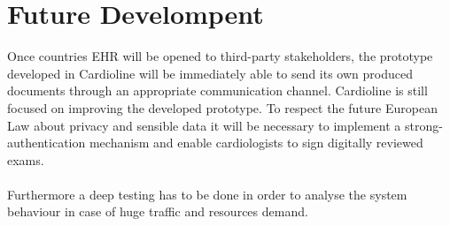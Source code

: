 \section{Future Develompent}
Once countries EHR will be opened to third-party stakeholders, the prototype developed in Cardioline will be immediately able to send its own produced documents through an appropriate communication channel.
Cardioline is still focused on improving the developed prototype. To respect the future European Law about privacy and sensible data it will be necessary to implement a strong-authentication mechanism and enable cardiologists to sign digitally reviewed exams.\\ \\
Furthermore a deep testing has to be done in order to analyse the system behaviour in case of huge traffic and resources demand.\\